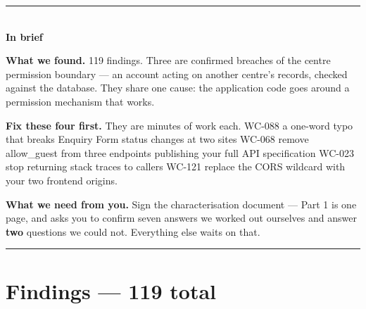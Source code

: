 \documentclass[10pt,a4paper]{article}
\newcommand{\display}{\sffamily}
\newcommand{\code}[1]{{\ttfamily #1}}
\begin{document}
{\color{rule}\rule{\textwidth}{0.5pt}}\\[0.30cm]
{\display\small\bfseries\color{accent}In brief}\\[0.35em]
{\footnotesize\raggedright
\textbf{What we found.} 119 findings. Three are confirmed breaches of the centre permission
boundary — an account acting on another centre's records, checked against the database. They share
one cause: the application code goes around a permission mechanism that works.

\vspace{0.25em}
\textbf{Fix these four first.} They are minutes of work each.
\code{WC-088} a one-word typo that breaks Enquiry Form status changes at two sites \textbullet{}
\code{WC-068} remove \code{allow\_guest} from three endpoints publishing your full API specification \textbullet{}
\code{WC-023} stop returning stack traces to callers \textbullet{}
\code{WC-121} replace the CORS wildcard with your two frontend origins.

\vspace{0.25em}
\textbf{What we need from you.} Sign the characterisation document — Part 1 is one page, and asks
you to confirm seven answers we worked out ourselves and answer \textbf{two} questions we could not.
Everything else waits on that.\par}

\vspace{0.15cm}
{\color{rule}\rule{\textwidth}{0.5pt}}

\section{Findings — 119 total}

\vspace{0.1cm}
\begin{center}
\end{center}
\vspace{0.15cm}
\end{document}
